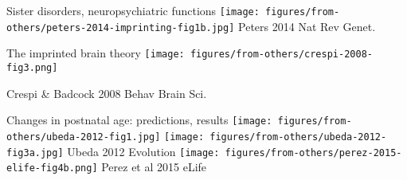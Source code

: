 \documentclass{beamer}
\begin{document}
\begin{frame}[t]{Sister disorders, neuropsychiatric functions}
\texttt{[image: figures/from-others/peters-2014-imprinting-fig1b.jpg]}
{\tiny Peters 2014 Nat Rev Genet.}

\end{frame}

\begin{frame}{The imprinted brain theory}
\texttt{[image: figures/from-others/crespi-2008-fig3.png]}
\vfill
{\tiny \raggedright{Crespi \& Badcock 2008 Behav Brain Sci.}}
\end{frame}

\begin{frame}{Changes in postnatal age: predictions, results}
\texttt{[image: figures/from-others/ubeda-2012-fig1.jpg]}
\hfill
\texttt{[image: figures/from-others/ubeda-2012-fig3a.jpg]}
{\tiny Ubeda 2012 Evolution}
\vfill
\texttt{[image: figures/from-others/perez-2015-elife-fig4b.png]}
{\tiny Perez et al 2015 eLife}
\end{frame}
\end{document}
